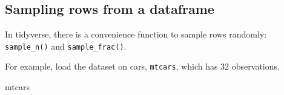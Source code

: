 \documentclass[]{book}
\newenvironment{Shaded}{\begin{snugshade}}{\end{snugshade}}
\newcommand{\NormalTok}[1]{#1}
\theoremstyle{definition}
\theoremstyle{definition}
\theoremstyle{definition}
\theoremstyle{remark}
\begin{document}
\hypertarget{sampling-rows-from-a-dataframe}{%
\subsection{Sampling rows from a dataframe}\label{sampling-rows-from-a-dataframe}}

In tidyverse, there is a convenience function to sample rows randomly: \texttt{sample\_n()} and \texttt{sample\_frac()}.

For example, load the dataset on cars, \texttt{mtcars}, which has 32 observations.

\begin{Shaded}
\begin{Highlighting}[]
\NormalTok{mtcars}
\end{Highlighting}
\end{Shaded}
\end{document}
